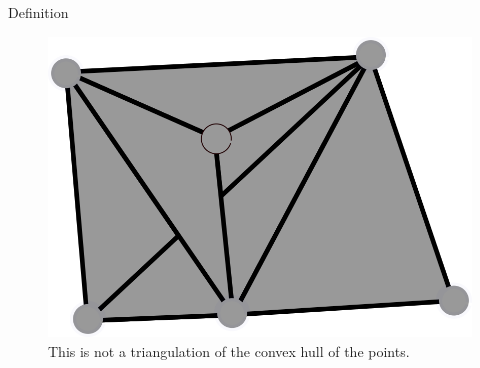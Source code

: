\documentclass[18pt]{beamer}
\begin{document}
\begin{frame}{Definition}
\begin{overprint}
\begin{figure}
  \centering
  \includegraphics[scale=1.5]{NotTrig2}
  \caption{\label{NotTrig1} This is not a triangulation of the convex hull of the points.}
\end{figure}
\end{overprint}
\end{frame}
\end{document}
